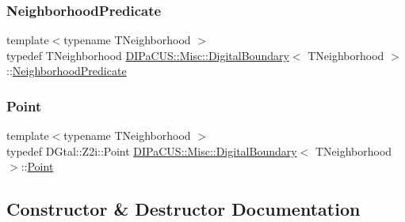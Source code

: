 \subsubsection{\texorpdfstring{Neighborhood\+Predicate}{NeighborhoodPredicate}}
{\footnotesize\ttfamily template$<$typename T\+Neighborhood $>$ \\
typedef T\+Neighborhood \mbox{\hyperlink{structDIPaCUS_1_1Misc_1_1DigitalBoundary}{D\+I\+Pa\+C\+U\+S\+::\+Misc\+::\+Digital\+Boundary}}$<$ T\+Neighborhood $>$\+::\mbox{\hyperlink{structDIPaCUS_1_1Misc_1_1DigitalBoundary_a66b2b672db2006130bd100902d4d8684}{Neighborhood\+Predicate}}}

\mbox{\label{structDIPaCUS_1_1Misc_1_1DigitalBoundary_a4434320a7be995d954820b08574eb33c}} 
\subsubsection{\texorpdfstring{Point}{Point}}
{\footnotesize\ttfamily template$<$typename T\+Neighborhood $>$ \\
typedef D\+Gtal\+::\+Z2i\+::\+Point \mbox{\hyperlink{structDIPaCUS_1_1Misc_1_1DigitalBoundary}{D\+I\+Pa\+C\+U\+S\+::\+Misc\+::\+Digital\+Boundary}}$<$ T\+Neighborhood $>$\+::\mbox{\hyperlink{structDIPaCUS_1_1Misc_1_1DigitalBoundary_a4434320a7be995d954820b08574eb33c}{Point}}}



\subsection{Constructor \& Destructor Documentation}
\mbox{\label{structDIPaCUS_1_1Misc_1_1DigitalBoundary_a1d4a4dcc4c7c471e09266ab1832f480d}} 
